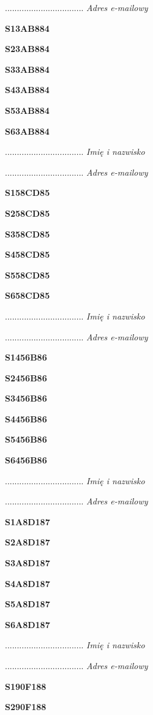 .................................
\textit{Adres e-mailowy}

\Large \textbf{S13AB884}

\Large \textbf{S23AB884}

\Large \textbf{S33AB884}

\Large \textbf{S43AB884}

\Large \textbf{S53AB884}

\Large \textbf{S63AB884}

.................................
\textit{Imię i nazwisko}

.................................
\textit{Adres e-mailowy}

\Large \textbf{S158CD85}

\Large \textbf{S258CD85}

\Large \textbf{S358CD85}

\Large \textbf{S458CD85}

\Large \textbf{S558CD85}

\Large \textbf{S658CD85}

.................................
\textit{Imię i nazwisko}

.................................
\textit{Adres e-mailowy}

\Large \textbf{S1456B86}

\Large \textbf{S2456B86}

\Large \textbf{S3456B86}

\Large \textbf{S4456B86}

\Large \textbf{S5456B86}

\Large \textbf{S6456B86}

.................................
\textit{Imię i nazwisko}

.................................
\textit{Adres e-mailowy}

\Large \textbf{S1A8D187}

\Large \textbf{S2A8D187}

\Large \textbf{S3A8D187}

\Large \textbf{S4A8D187}

\Large \textbf{S5A8D187}

\Large \textbf{S6A8D187}

.................................
\textit{Imię i nazwisko}

.................................
\textit{Adres e-mailowy}

\Large \textbf{S190F188}

\Large \textbf{S290F188}

